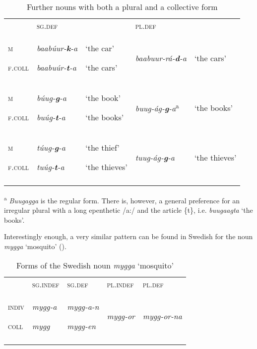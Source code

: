 \documentclass[output=paper]{langsci/langscibook}
\begin{document}
\begin{table}
\caption{Further nouns with both a plural and a collective form}
\label{tab:10}

\begin{tabularx}{\textwidth}{XXXXX} & {\textsc{sg.def}} &  & {\textsc{pl.def}} & \\
\lsptoprule
{\textsc{m}}

{\textsc{f.coll}} & {\textit{baabúur-}\textbf{\textit{k}}\textit{{}-a}}

{\textit{baabuúr-}\textbf{\textit{t}}\textit{{}-a}} & {‘the car’}

{‘the cars’} & {\textit{baabuur-rá-}\textbf{\textit{d}}\textit{{}-a}} & {‘the cars’}\\
{\textsc{m}}

{\textsc{f.coll}} & {\textit{búug-}\textbf{\textit{g}}\textit{{}-a}}

{\textit{buúg-}\textbf{\textit{t}}\textit{{}-a}} & {‘the book’}

{‘the books’} & {\textit{buug-ág-}\textbf{\textit{g}}\textit{{}-a}\textsuperscript{a}} & {‘the books’}\\
{\textsc{m}}

{\textsc{f.coll}} & {\textit{túug-}\textbf{\textit{g}}\textit{{}-a}}

{\textit{tuúg-}\textbf{\textit{t}}\textit{{}-a}} & {‘the thief’}

{‘the thieves’} & {\textit{tuug-ág-}\textbf{\textit{g}}\textit{{}-a}} & {‘the thieves’}\\
\lspbottomrule
\end{tabularx}

\end{table} 

\textsuperscript{a} \textit{Buugagga} is the regular form. There is, however, a general preference for an irregular plural with a long epenthetic /a:/ and the article \{t\}, i.e. \textit{buugaagta} ‘the books’.

Interestingly enough, a very similar pattern can be found in Swedish for the noun \textit{mygga} ‘mosquito’ ().\textit{ }


\begin{table}
\caption{Forms of the Swedish noun \textit{mygga} ‘mosquito’}
\label{tab:11}
\begin{tabularx}{\textwidth}{XXXXX} & {\textsc{sg.indef}} & {\textsc{sg.def}} & {\textsc{pl.indef}} & {\textsc{pl.def}}\\
\lsptoprule
{\textsc{indiv}}

{\textsc{coll}} & {\textit{mygg-a}}

{\textit{mygg}} & {\textit{mygg-a-n}}

{\textit{mygg-en}} & {\textit{mygg-or}} & {\textit{mygg-or-na}}\\
\lspbottomrule
\end{tabularx}

\end{table} 
\end{document}
